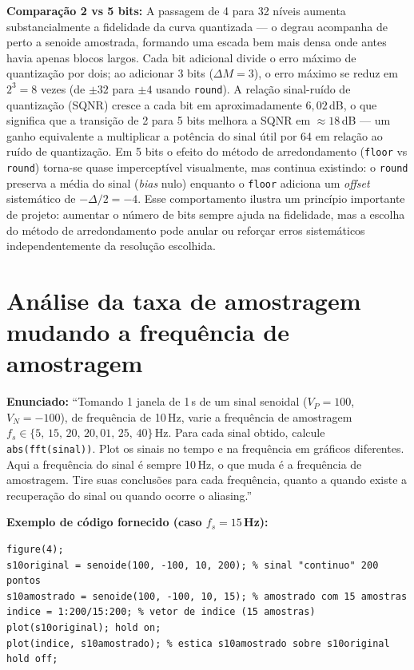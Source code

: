 \documentclass[12pt]{article}
\begin{document}
\textbf{Comparação 2 vs 5 bits:} A passagem de 4 para 32 níveis aumenta substancialmente a fidelidade da curva quantizada — o degrau acompanha de perto a senoide amostrada, formando uma escada bem mais densa onde antes havia apenas blocos largos. Cada bit adicional divide o erro máximo de quantização por dois; ao adicionar 3 bits ($\Delta M = 3$), o erro máximo se reduz em $2^{3}=8$ vezes (de $\pm 32$ para $\pm 4$ usando \texttt{round}). A relação sinal-ruído de quantização (SQNR) cresce a cada bit em aproximadamente $6{,}02$\,dB, o que significa que a transição de 2 para 5 bits melhora a SQNR em $\approx 18$\,dB — um ganho equivalente a multiplicar a potência do sinal útil por 64 em relação ao ruído de quantização. Em 5 bits o efeito do método de arredondamento (\texttt{floor} vs \texttt{round}) torna-se quase imperceptível visualmente, mas continua existindo: o \texttt{round} preserva a média do sinal (\textit{bias} nulo) enquanto o \texttt{floor} adiciona um \textit{offset} sistemático de $-\Delta/2 = -4$. Esse comportamento ilustra um princípio importante de projeto: aumentar o número de bits sempre ajuda na fidelidade, mas a escolha do método de arredondamento pode anular ou reforçar erros sistemáticos independentemente da resolução escolhida.

\clearpage
\section{Análise da taxa de amostragem mudando a frequência de amostragem}

\textbf{Enunciado:} ``Tomando 1 janela de 1\,s de um sinal senoidal ($V_P = 100$, $V_N = -100$), de frequência de 10\,Hz, varie a frequência de amostragem $f_s \in \{5,\,15,\,20,\,20{,}01,\,25,\,40\}$\,Hz. Para cada sinal obtido, calcule \texttt{abs(fft(sinal))}. Plot os sinais no tempo e na frequência em gráficos diferentes. Aqui a frequência do sinal é sempre 10\,Hz, o que muda é a frequência de amostragem. Tire suas conclusões para cada frequência, quanto a quando existe a recuperação do sinal ou quando ocorre o aliasing.''

\textbf{Exemplo de código fornecido (caso $f_s = 15$\,Hz):}
\begin{lstlisting}
figure(4);
s10original = senoide(100, -100, 10, 200); % sinal "continuo" 200 pontos
s10amostrado = senoide(100, -100, 10, 15); % amostrado com 15 amostras
indice = 1:200/15:200; % vetor de indice (15 amostras)
plot(s10original); hold on;
plot(indice, s10amostrado); % estica s10amostrado sobre s10original
hold off;
\end{lstlisting}
\end{document}
